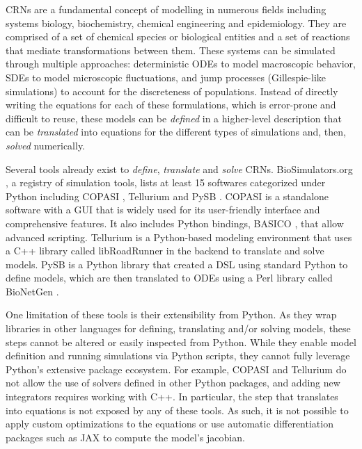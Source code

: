 \documentclass[namedate,numsec,webpdf,modern,large]{oup-authoring-template}
\theoremstyle{thmstyleone}%
\theoremstyle{thmstyletwo}%
\theoremstyle{thmstylethree}%
\begin{document}
\Acp{CRN} are a fundamental concept of modelling in numerous fields
including systems biology, biochemistry, chemical engineering and epidemiology.
They are comprised of a set of chemical species or biological entities
and a set of reactions that mediate transformations between them.
These systems can be simulated through multiple approaches:
deterministic \acp{ODE} to model macroscopic behavior,
\acp{SDE} to model microscopic fluctuations,
and jump processes (Gillespie-like simulations) to account for the discreteness of populations.
Instead of directly writing the equations for each of these formulations,
which is error-prone and difficult to reuse,
these models can be \emph{defined} in a higher-level description
that can be \emph{translated} into equations for the different types of simulations
and, then, \emph{solved} numerically.

Several tools already exist to \emph{define}, \emph{translate} and \emph{solve} \acp{CRN}.
BioSimulators.org \citep{shaikhBioSimulatorsCentralRegistry2022},
a registry of simulation tools,
lists at least 15 softwares categorized under Python including
COPASI \citep{hoopsCOPASICOmplexPAthway2006},
Tellurium \citep{choiTelluriumExtensiblePythonbased2018} and
PySB \citep{lopezProgrammingBiologicalModels2013}.
COPASI is a standalone software with a \ac{GUI}
that is widely used for its user-friendly interface and comprehensive features.
It also includes Python bindings, BASICO \citep{bergmannBASICOSimplifiedPython2023b}, that allow advanced scripting.
Tellurium is a Python-based modeling environment
that uses a C++ library called libRoadRunner \citep{welshLibRoadRunnerHighPerformance2023} in the backend to translate and solve models.
PySB is a Python library that created a \ac{DSL} using standard Python to define models,
which are then translated to \acp{ODE} using a Perl library called BioNetGen \citep{harrisBioNetGenAdvancesRulebased2016}.

One limitation of these tools is their extensibility from Python.
As they wrap libraries in other languages for defining, translating and/or solving models,
these steps cannot be altered or easily inspected from Python.
While they enable model definition and running simulations via Python scripts,
they cannot fully leverage Python's extensive package ecosystem.
For example,
COPASI and Tellurium do not allow the use of solvers defined in other Python packages,
and adding new integrators requires working with C++.
In particular, the step that translates into equations is not exposed by any of these tools.
As such, it is not possible to apply custom optimizations to the equations
or use automatic differentiation packages such as JAX \citep{jax2018github} to compute the model's jacobian.
\end{document}
